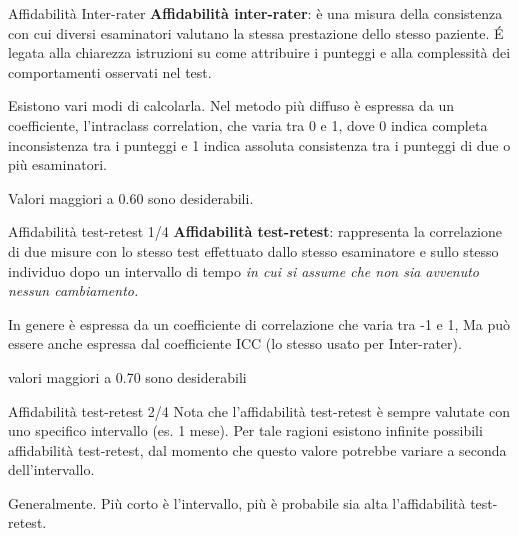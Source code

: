 \documentclass[
  ignorenonframetext,
]{beamer}
\begin{document}
\begin{frame}{Affidabilità Inter-rater}
\label{affidabilituxe0-inter-rater}
\textbf{Affidabilità inter-rater}: è una misura della consistenza con
cui diversi esaminatori valutano la stessa prestazione dello stesso
paziente. É legata alla chiarezza istruzioni su come attribuire i
punteggi e alla complessità dei comportamenti osservati nel test.

Esistono vari modi di calcolarla. Nel metodo più diffuso è espressa da
un coefficiente, l'intraclass correlation, che varia tra 0 e 1, dove 0
indica completa inconsistenza tra i punteggi e 1 indica assoluta
consistenza tra i punteggi di due o più esaminatori.

Valori maggiori a 0.60 sono desiderabili.
\end{frame}

\begin{frame}{Affidabilità test-retest 1/4}
\label{affidabilituxe0-test-retest-14}
\textbf{Affidabilità test-retest}: rappresenta la correlazione di due
misure con lo stesso test effettuato dallo stesso esaminatore e sullo
stesso individuo dopo un intervallo di tempo \emph{in cui si assume che
non sia avvenuto nessun cambiamento.}

In genere è espressa da un coefficiente di correlazione che varia tra -1
e 1, Ma può essere anche espressa dal coefficiente ICC (lo stesso usato
per Inter-rater).

valori maggiori a 0.70 sono desiderabili
\end{frame}

\begin{frame}{Affidabilità test-retest 2/4}
\label{affidabilituxe0-test-retest-24}
Nota che l'affidabilità test-retest è sempre valutate con uno specifico
intervallo (es. 1 mese). Per tale ragioni esistono infinite possibili
affidabilità test-retest, dal momento che questo valore potrebbe variare
a seconda dell'intervallo.

Generalmente. Più corto è l'intervallo, più è probabile sia alta
l'affidabilità test-retest.
\end{frame}
\end{document}
